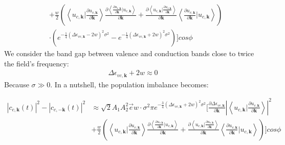 \begin{equation}
\begin{aligned}
    &+\frac{w}{2} (\left \langle u_{c,\mathbf k} \big | \frac{\partial u_{v,\mathbf k}}{\partial \mathbf k}  \right \rangle \frac{\partial{\left \langle\frac{\partial u_{v,\mathbf k}}{\partial \mathbf k}\Big |u_{c,\mathbf k}\right \rangle}}{\partial {\mathbf k}} +
   \frac{\partial{\left \langle u_{c,\mathbf k}\Big |\frac{\partial u_{v,\mathbf k}}{\partial \mathbf k} \right \rangle}}{\partial {\mathbf k}}
    \left \langle \frac{\partial u_{v,\mathbf k}}{\partial \mathbf k} |  u_{c,\mathbf k} \right \rangle)\\
    &\cdot(e^{-\frac{1}{4}(\Delta \epsilon_{vc,\mathbf k} - 2w)^2 \sigma^2}
    -e^{-\frac{1}{4}(\Delta \epsilon_{vc,\mathbf k} + 2w)^2 \sigma^2})]cos\phi
    \end{aligned}
\end{equation}
We consider the band gap between valence and conduction bands close to twice the field's frequency:
\begin{align}
\Delta \epsilon_{vc,\mathbf k}+2w\approx0    
\end{align}
Because $\sigma\gg 0$. In a nutshell, the population imbalance becomes:

\begin{equation}
    \begin{aligned}
 |c_{c,\mathbf k}(t)|^2-|c_{c,-\mathbf k}(t)|^2&\approx\sqrt{2} A_1 A_2^2 \vec e w \cdot \sigma^2 \pi e^{-\frac{3}{4}(\Delta \epsilon_{vc,\mathbf k} + 2w)^2 \sigma^2}[\frac{\partial  \Delta \epsilon_{vc,\mathbf k}}{\partial \mathbf k} |\left \langle u_{c,\mathbf k}\Big |\frac{\partial u_{v,\mathbf k}}{\partial \mathbf k} \right \rangle|^2 \\
    &+\frac{w}{2} (\left \langle u_{c,\mathbf k} \big | \frac{\partial u_{v,\mathbf k}}{\partial \mathbf k}  \right \rangle \frac{\partial{\left \langle\frac{\partial u_{v,\mathbf k}}{\partial \mathbf k}\Big |u_{c,\mathbf k}\right \rangle}}{\partial {\mathbf k}} +
   \frac{\partial{\left \langle u_{c,\mathbf k}\Big |\frac{\partial u_{v,\mathbf k}}{\partial \mathbf k} \right \rangle}}{\partial {\mathbf k}}
    \left \langle \frac{\partial u_{v,\mathbf k}}{\partial \mathbf k} |  u_{c,\mathbf k} \right \rangle)]cos\phi
    \end{aligned}
\label{perturbationresult}
\end{equation}

